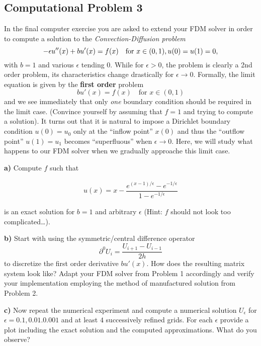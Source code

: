 \documentclass[11pt]{article}
\begin{document}
    \subsection{Computational Problem 3}\label{computational-problem-3}

In the final computer exercise you are asked to extend your FDM solver
in order to compute a solution to the \emph{Convection-Diffusion
problem} \[
- \epsilon u''(x) + b u'(x) = f(x) \quad \text{for } x \in (0,1),
\\
u(0) = u(1) = 0,
\] with \(b = 1\) and various \(\epsilon\) tending \(0\). While for
\(\epsilon > 0\), the problem is clearly a 2nd order problem, its
characteristics change drastically for \(\epsilon \to 0\). Formally, the
limit equation is given by the \textbf{first order} problem \[
b u'(x) = f(x) \quad \text{for } x \in (0,1)
\] and we see immediately that only \emph{one} boundary condition should
be required in the limit case. (Convince yourself by assuming that
\(f = 1\) and trying to compute a solution). It turns out that it is
natural to impose a Dirichlet boundary condition \(u(0) = u_0\) only at
the ``inflow point'' \(x(0)\) and thus the ``outflow point''
\(u(1) = u_1\) becomes ``superfluous'' when \(\epsilon \to 0\). Here, we
will study what happens to our FDM solver when we gradually approache
this limit case.

\textbf{a)} Compute \(f\) such that

\begin{align}
  u(x)
  = 
  x - 
  \dfrac{e^{(x-1)/\epsilon} - e^{-1/\epsilon}}
  {1 - e^{-1/\epsilon}}
\end{align}

is an exact solution for \(b = 1\) and arbitrary \(\epsilon\) (Hint:
\(f\) should not look too complicated\ldots{}).

\textbf{b)} Start with using the symmetric/central difference operator
\[
\partial^0 U_i = \dfrac{U_{i+1} - U_{i-1}}{2h}
\] to discretize the first order derivative \(b u'(x)\). How does the
resulting matrix system look like? Adapt your FDM solver from Problem 1
accordingly and verify your implementation employing the method of
manufactured solution from Problem 2.

\textbf{c)} Now repeat the numerical experiment and compute a numerical
solution \(U_{\epsilon}\) for \(\epsilon = 0.1, 0.01. 0.001\) and at
least \(4\) successively refined grids. For each \(\epsilon\) provide a
plot including the exact solution and the computed approximations. What
do you observe?
\end{document}
